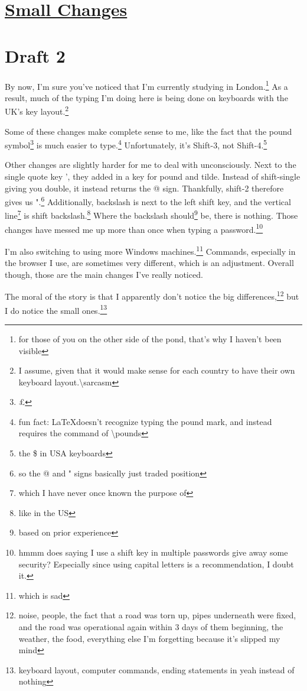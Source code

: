 \documentclass[12pt]{article}[titlepage]
\newcommand{\1}{\={a}}
\newcommand{\2}{\={e}}
\newcommand{\3}{\={\i}}
\newcommand{\4}{\=o}
\newcommand{\5}{\=u}
\newcommand{\6}{\={A}}
\renewcommand{\,}{\textsuperscript{,}}
\begin{document}
\doublespacing

\section{\href{small-changes.html}{Small Changes}
}
\section{Draft 2}

By now, I'm sure you've noticed that I'm currently studying in London.\footnote{for those of you on the other side of the pond, that's why I haven't been visible}
As a result, much of the typing I'm doing here is being done on keyboards with the UK's key layout.\footnote{I assume, given that it would make sense for each country to have their own keyboard layout.\textbackslash{}sarcasm}

Some of these changes make complete sense to me, like the fact that the pound symbol\footnote{\pounds} is much easier to type.\footnote{fun fact: \LaTeX doesn't recognize typing the pound mark, and instead requires the command of \textbackslash{}pounds}
Unfortunately, it's Shift-3, not Shift-4.\footnote{the \$ in USA keyboards}

Other changes are slightly harder for me to deal with unconsciously.
Next to the single quote key ', they added in a key for pound and tilde.
Instead of shift-single giving you double, it instead returns the @ sign.
Thankfully, shift-2 therefore gives us ".\footnote{so the @ and " signs basically just traded position}
Additionally, backslash is next to the left shift key, and the vertical line\footnote{which I have never once known the purpose of} is shift backslash.\footnote{like in the US}
Where the backslash should\footnote{based on prior experience} be, there is nothing.
Those changes have messed me up more than once when typing a password.\footnote{hmmm does saying I use a shift key in multiple passwords give away some security? Especially since using capital letters is a recommendation, I doubt it.}

I'm also switching to using more Windows machines.\footnote{which is sad}
Commands, especially in the browser I use, are sometimes very different, which is an adjustment.
Overall though, those are the main changes I've really noticed.

The moral of the story is that I apparently don't notice the big differences,\footnote{noise, people, the fact that a road was torn up, pipes underneath were fixed, and the road was operational again within 3 days of them beginning, the weather, the food, everything else I'm forgetting because it's slipped my mind} but I do notice the small ones.\footnote{keyboard layout, computer commands, ending statements in yeah instead of nothing}
\end{document}

